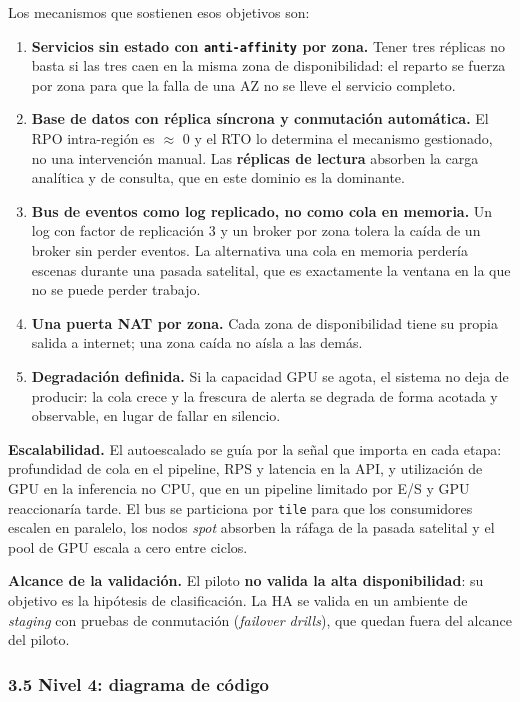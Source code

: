\documentclass{article}
\begin{document}
Los mecanismos que sostienen esos objetivos son:

\begin{enumerate}
  \item \textbf{Servicios sin estado con \texttt{anti-\allowbreak{}affinity} por zona.} Tener tres réplicas no basta si las tres caen en la misma zona de disponibilidad: el reparto se fuerza por zona para que la falla de una AZ no se lleve el servicio completo.
  \item \textbf{Base de datos con réplica síncrona y conmutación automática.} El RPO intra-región es \ensuremath{\approx} 0 y el RTO lo determina el mecanismo gestionado, no una intervención manual. Las \textbf{réplicas de lectura} absorben la carga analítica y de consulta, que en este dominio es la dominante.
  \item \textbf{Bus de eventos como log replicado, no como cola en memoria.} Un log con factor de replicación 3 y un broker por zona tolera la caída de un broker sin perder eventos. La alternativa \textemdash{}una cola en memoria\textemdash{} perdería escenas durante una pasada satelital, que es exactamente la ventana en la que no se puede perder trabajo.
  \item \textbf{Una puerta NAT por zona.} Cada zona de disponibilidad tiene su propia salida a internet; una zona caída no aísla a las demás.
  \item \textbf{Degradación definida.} Si la capacidad GPU se agota, el sistema no deja de producir: la cola crece y la frescura de alerta se degrada de forma acotada y observable, en lugar de fallar en silencio.
\end{enumerate}

\textbf{Escalabilidad.} El autoescalado se guía por la señal que importa en cada etapa: profundidad de cola en el pipeline, RPS y latencia en la API, y utilización de GPU en la inferencia \textemdash{}no CPU, que en un pipeline limitado por E/S y GPU reaccionaría tarde. El bus se particiona por \texttt{tile} para que los consumidores escalen en paralelo, los nodos \emph{spot} absorben la ráfaga de la pasada satelital y el pool de GPU escala a cero entre ciclos.

\textbf{Alcance de la validación.} El piloto \textbf{no valida la alta disponibilidad}: su objetivo es la hipótesis de clasificación. La HA se valida en un ambiente de \emph{staging} con pruebas de conmutación (\emph{failover drills}), que quedan fuera del alcance del piloto.

\subsubsection{3.5 Nivel 4: diagrama de código}
\end{document}
